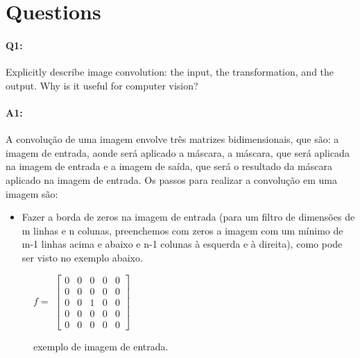 
\section*{Questions}

\paragraph{Q1:} Explicitly describe image convolution: the input, the transformation, and the output. Why is it useful for computer vision?

\paragraph{A1:} A convolução de uma imagem envolve três matrizes bidimensionais, que são: a imagem de entrada, aonde será aplicado a máscara, a máscara, que será aplicada na imagem de entrada e a imagem de saída, que será o resultado da máscara aplicado na imagem de entrada. Os passos para realizar a convolução em uma imagem são:
\begin{itemize}
	\item Fazer a borda de zeros na imagem de entrada (para um filtro de dimensões de m linhas e n colunas, preenchemos com zeros a imagem com um mínimo de m-1 linhas acima e abaixo e n-1 colunas à esquerda e à direita), como pode ser visto no exemplo abaixo.
\end{itemize}

\begin{figure}[!htb]
	\centering
	$ f = $
	$
	\begin{bmatrix}
	    0 & 0 & 0 & 0 & 0 \\
	    0 & 0 & 0 & 0 & 0 \\
	    0 & 0 & 1 & 0 & 0 \\
	    0 & 0 & 0 & 0 & 0 \\
	    0 & 0 & 0 & 0 & 0
	\end{bmatrix}
	$
	\caption{exemplo de imagem de entrada.}
	\label{fig:input_matrix}
\end{figure}

